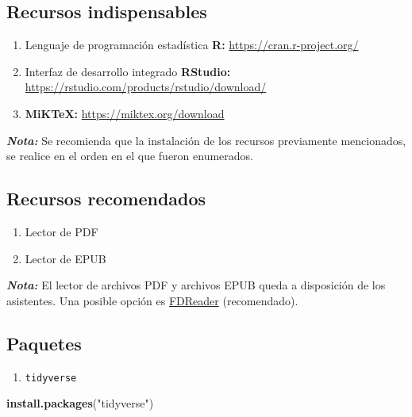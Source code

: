 \documentclass[
]{book}
\newenvironment{Shaded}{\begin{snugshade}}{\end{snugshade}}
\newcommand{\KeywordTok}[1]{\textcolor[rgb]{0.13,0.29,0.53}{\textbf{#1}}}
\newcommand{\NormalTok}[1]{#1}
\newcommand{\StringTok}[1]{\textcolor[rgb]{0.31,0.60,0.02}{#1}}
\providecommand{\tightlist}{%
  \setlength{\itemsep}{0pt}\setlength{\parskip}{0pt}}
\begin{document}
\hypertarget{recursos-indispensables}{%
\subsection{Recursos indispensables}\label{recursos-indispensables}}

\begin{enumerate}
\def\labelenumi{\arabic{enumi}.}
\item
  Lenguaje de programación estadística \textbf{R:} \url{https://cran.r-project.org/}
\item
  Interfaz de desarrollo integrado \textbf{RStudio:} \url{https://rstudio.com/products/rstudio/download/}
\item
  \textbf{MiKTeX:} \url{https://miktex.org/download}
\end{enumerate}

\textbf{\emph{Nota:}} Se recomienda que la instalación de los recursos previamente mencionados, se realice en el orden en el que fueron enumerados.

\hypertarget{recursos-recomendados}{%
\subsection{Recursos recomendados}\label{recursos-recomendados}}

\begin{enumerate}
\def\labelenumi{\arabic{enumi}.}
\item
  Lector de PDF
\item
  Lector de EPUB
\end{enumerate}

\textbf{\emph{Nota:}} El lector de archivos PDF y archivos EPUB queda a disposición de los asistentes. Una posible opción es \href{https://fbreader.org/}{FDReader} (recomendado).

\hypertarget{paquetes}{%
\subsection{Paquetes}\label{paquetes}}

\begin{enumerate}
\def\labelenumi{\arabic{enumi}.}
\tightlist
\item
  \texttt{tidyverse}
\end{enumerate}

\begin{Shaded}
\begin{Highlighting}[]
\KeywordTok{install.packages}\NormalTok{(}\StringTok{"tidyverse"}\NormalTok{)}
\end{Highlighting}
\end{Shaded}
\end{document}
